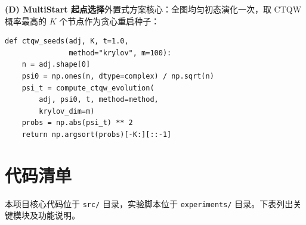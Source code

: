 \documentclass[pre,twocolumn]{revtex4-2}
\begin{document}
\medskip
\noindent\textbf{(D) MultiStart 起点选择}\quad 外置式方案核心：全图均匀初态演化一次，取 CTQW 概率最高的 $K$ 个节点作为贪心重启种子：
\begin{verbatim}
def ctqw_seeds(adj, K, t=1.0,
               method="krylov", m=100):
    n = adj.shape[0]
    psi0 = np.ones(n, dtype=complex) / np.sqrt(n)
    psi_t = compute_ctqw_evolution(
        adj, psi0, t, method=method,
        krylov_dim=m)
    probs = np.abs(psi_t) ** 2
    return np.argsort(probs)[-K:][::-1]
\end{verbatim}

\newpage
\section{代码清单}

本项目核心代码位于 \texttt{src/} 目录，实验脚本位于 \texttt{experiments/} 目录。下表列出关键模块及功能说明。
\end{document}
